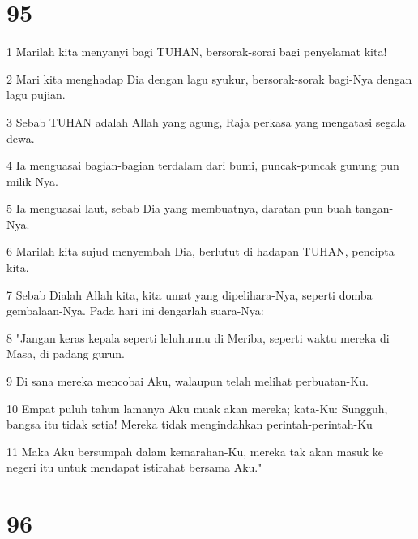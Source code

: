 \chapter{95}

\par 1 Marilah kita menyanyi bagi TUHAN, bersorak-sorai bagi penyelamat kita!
\par 2 Mari kita menghadap Dia dengan lagu syukur, bersorak-sorak bagi-Nya dengan lagu pujian.
\par 3 Sebab TUHAN adalah Allah yang agung, Raja perkasa yang mengatasi segala dewa.
\par 4 Ia menguasai bagian-bagian terdalam dari bumi, puncak-puncak gunung pun milik-Nya.
\par 5 Ia menguasai laut, sebab Dia yang membuatnya, daratan pun buah tangan-Nya.
\par 6 Marilah kita sujud menyembah Dia, berlutut di hadapan TUHAN, pencipta kita.
\par 7 Sebab Dialah Allah kita, kita umat yang dipelihara-Nya, seperti domba gembalaan-Nya. Pada hari ini dengarlah suara-Nya:
\par 8 "Jangan keras kepala seperti leluhurmu di Meriba, seperti waktu mereka di Masa, di padang gurun.
\par 9 Di sana mereka mencobai Aku, walaupun telah melihat perbuatan-Ku.
\par 10 Empat puluh tahun lamanya Aku muak akan mereka; kata-Ku: Sungguh, bangsa itu tidak setia! Mereka tidak mengindahkan perintah-perintah-Ku
\par 11 Maka Aku bersumpah dalam kemarahan-Ku, mereka tak akan masuk ke negeri itu untuk mendapat istirahat bersama Aku."

\chapter{96}

